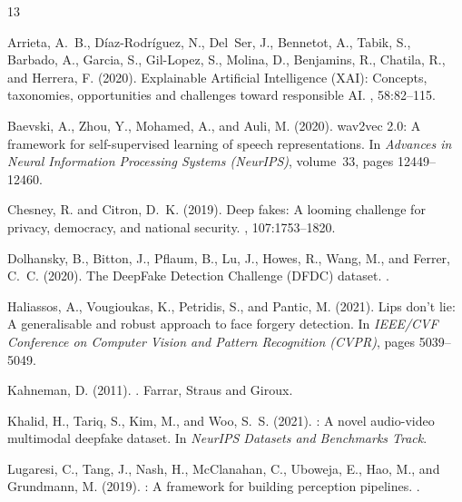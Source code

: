 \documentclass[11pt,a4paper]{article}
\begin{document}

\begin{thebibliography}{13}

Arrieta, A.~B., D{\'i}az-Rodr{\'i}guez, N., Del~Ser, J., Bennetot, A., Tabik, S., Barbado, A., Garcia, S., Gil-Lopez, S., Molina, D., Benjamins, R., Chatila, R., and Herrera, F. (2020).
\newblock Explainable {Artificial Intelligence} ({XAI}): Concepts, taxonomies, opportunities and challenges toward responsible {AI}.
, 58:82--115.

Baevski, A., Zhou, Y., Mohamed, A., and Auli, M. (2020).
\newblock wav2vec 2.0: A framework for self-supervised learning of speech representations.
\newblock In {\em Advances in Neural Information Processing Systems (NeurIPS)}, volume~33, pages 12449--12460.

Chesney, R. and Citron, D.~K. (2019).
\newblock Deep fakes: A looming challenge for privacy, democracy, and national security.
, 107:1753--1820.

Dolhansky, B., Bitton, J., Pflaum, B., Lu, J., Howes, R., Wang, M., and Ferrer, C.~C. (2020).
\newblock The {DeepFake Detection Challenge} ({DFDC}) dataset.
.

Haliassos, A., Vougioukas, K., Petridis, S., and Pantic, M. (2021).
\newblock Lips don't lie: A generalisable and robust approach to face forgery detection.
\newblock In {\em IEEE/CVF Conference on Computer Vision and Pattern Recognition (CVPR)}, pages 5039--5049.

Kahneman, D. (2011).
.
\newblock Farrar, Straus and Giroux.

Khalid, H., Tariq, S., Kim, M., and Woo, S.~S. (2021).
: A novel audio-video multimodal deepfake dataset.
\newblock In {\em NeurIPS Datasets and Benchmarks Track}.

Lugaresi, C., Tang, J., Nash, H., McClanahan, C., Uboweja, E., Hao, M., and Grundmann, M. (2019).
: A framework for building perception pipelines.
.


\end{thebibliography}
\end{document}
